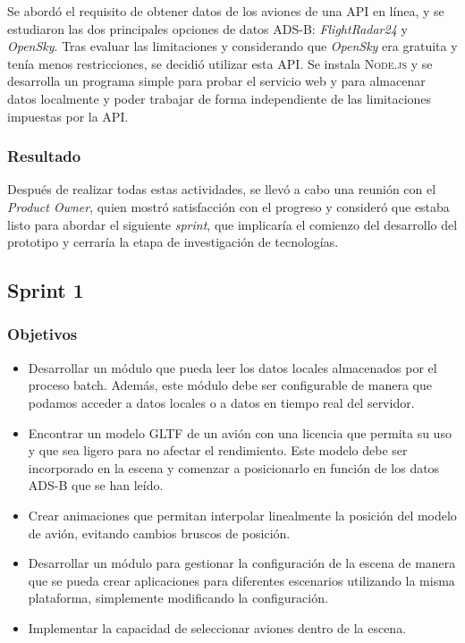 \documentclass[a4paper, 11pt]{book}
\begin{document}
Se abordó el requisito de obtener datos de los aviones de una \textsc{API} en línea, y se estudiaron las dos principales opciones de datos \textsc{ADS-B}: \emph{FlightRadar24} y \emph{OpenSky}. Tras evaluar las limitaciones y considerando que \emph{OpenSky} era gratuita y tenía menos restricciones, se decidió utilizar esta \textsc{API}.
Se instala \textsc{Node.js} y se desarrolla un programa simple para probar el servicio web y para almacenar datos localmente y poder trabajar de forma independiente de las limitaciones impuestas por la \textsc{API}.
\subsubsection{Resultado}
Después de realizar todas estas actividades, se llevó a cabo una reunión con el \emph{Product Owner}, quien mostró satisfacción con el progreso y consideró que estaba listo para abordar el siguiente \emph{sprint}, que implicaría el comienzo del desarrollo del prototipo y cerraría la etapa de investigación de tecnologías.
\subsection{Sprint 1}
\subsubsection{Objetivos}
\begin{itemize}
    \item Desarrollar un módulo que pueda leer los datos locales almacenados por el proceso batch. Además, este módulo debe ser configurable de manera que podamos acceder a datos locales o a datos en tiempo real del servidor.
    \item Encontrar un modelo \textsc{GLTF} de un avión con una licencia que permita su uso y que sea ligero para no afectar el rendimiento. Este modelo debe ser incorporado en la escena y comenzar a posicionarlo en función de los datos \textsc{ADS-B} que se han leído.
    \item Crear animaciones que permitan interpolar linealmente la posición del modelo de avión, evitando cambios bruscos de posición.
    \item Desarrollar un módulo para gestionar la configuración de la escena de manera que se pueda crear aplicaciones para diferentes escenarios utilizando la misma plataforma, simplemente modificando la configuración.
    \item Implementar la capacidad de seleccionar aviones dentro de la escena.
\end{itemize}
\end{document}
